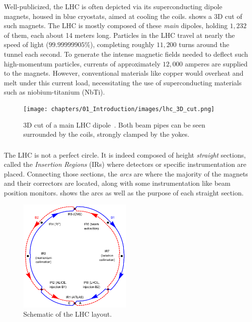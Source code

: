 Well-publicized, the LHC is often depicted via its superconducting dipole magnets, housed in blue
cryostats, aimed at cooling the coils.  shows a 3D cut of such magnets. The
LHC is mostly composed of these \textit{main} dipoles, holding $1,232$ of them, each about 14 meters
long. 
Particles in the LHC travel at nearly the speed of light ($99.99999905\%$), completing roughly
$11,200$ turns around the tunnel each second. To generate the intense magnetic fields needed to
deflect such high-momentum particles, currents of approximately $12,000$ amperes are supplied to the
magnets.  However, conventional materials like copper would overheat and melt under this current
load, necessitating the use of superconducting materials such as niobium-titanium (NbTi).


\begin{figure}[!htb]
    \centering
    \texttt{[image: chapters/01\_Introduction/images/lhc\_3D\_cut.png]}
    \caption{3D cut of a main LHC dipole~\cite{noauthor_cern_nodate}. Both beam pipes can be seen
    surrounded by the coils, strongly clamped by the yokes.}
    \label{fig:3d_cut_dipole}
\end{figure}


\subsubsection{}

The LHC is not a perfect circle. It is indeed composed of height \textit{straight} sections, called
the \textit{Insertion Regions} (IRs) where detectors or specific instrumentation are placed.
Connecting those sections, the \textit{arcs} are where the majority of the magnets and their
correctors are located, along with some instrumentation like beam position monitors.
 shows the arcs as well as the purpose of each straight section.

\begin{figure}[!htb]
    \centering
    \includegraphics[width=0.5\textwidth]{./images/irs.png}
    \caption{Schematic of the LHC layout.}
    \label{fig:introduction:lhc_irs}
\end{figure}


